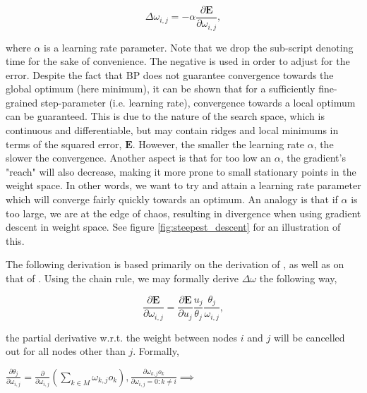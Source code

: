 \begin{equation}
    \Delta \omega_{i,j} = -\alpha \frac{\partial \textbf{E}}{\partial \omega_{i,j}},
\end{equation}

where $\alpha$ is a learning rate parameter. Note that we drop the sub-script denoting time for the sake of convenience.
The negative is used in order to adjust for the error. Despite the fact that BP does not guarantee convergence towards the global optimum (here minimum), it can be shown that for a sufficiently fine-grained step-parameter (i.e. learning rate), convergence towards a local optimum can be guaranteed. This is due to the nature of the search space, which is continuous and differentiable, but may contain ridges and local minimums in terms of the squared error, $\textbf{E}$. However, the smaller the learning rate $\alpha$, the slower the convergence. Another aspect is that for too low an $\alpha$, the gradient's "reach" will also decrease, making it more prone to small stationary points in the weight space. In other words, we want to try and attain a learning rate parameter which will converge fairly quickly towards an optimum. An analogy is that if $\alpha$ is too large, we are at the edge of chaos, resulting in divergence when using gradient descent in weight space. See figure \ref{fig:steepest_descent} for an illustration of this.

The following derivation is based primarily on the derivation of \cite{Rumelhart1986}, as well as on that of \cite{Russell2009}.
Using the chain rule, we may formally derive $\Delta \omega$ the following way,

\begin{equation}
    \frac{\partial \textbf{E}}{\partial \omega_{i,j}} = \frac{\partial \textbf{E}}{\partial u_j}
    \frac{u_j}{\theta_{j}}
    \frac{\theta_{j}}{\omega_{i,j}},
\end{equation}

the partial derivative w.r.t. the weight between nodes $i$ and $j$ will be cancelled out for all nodes other than $j$. Formally,

\begin{center}
\begin{math}
    \frac{\partial \theta_j}{\partial \omega_{i,j}} = \frac{\partial}{\partial \omega_{i,j}}(\sum_{k \in M}{} \omega_{k,j}o_k),
    \frac{\partial \omega_{k,j}o_k}{\partial \omega_{i,j} = 0 : k \neq i}
    \implies
\end{math}
\end{center}

